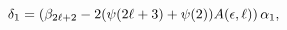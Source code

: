 $\delta_{1}=\left(\beta_{2\ell+2}-2(\mathop{\psi\/}\nolimits\!\left(2\ell+3%
\right)+\mathop{\psi\/}\nolimits\!\left(2\right))A(\epsilon,\ell)\right)\alpha%
_{1},$